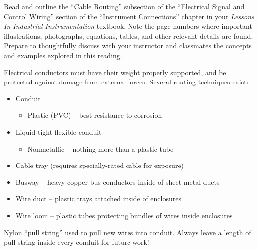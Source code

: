 

Read and outline the ``Cable Routing'' subsection of the ``Electrical Signal and Control Wiring'' section of the ``Instrument Connections'' chapter in your {\it Lessons In Industrial Instrumentation} textbook.  Note the page numbers where important illustrations, photographs, equations, tables, and other relevant details are found.  Prepare to thoughtfully discuss with your instructor and classmates the concepts and examples explored in this reading.














Electrical conductors must have their weight properly supported, and be protected against damage from external forces.  Several routing techniques exist:

\begin{itemize}
\item{} Conduit
\begin{itemize}

\item{} Plastic (PVC) -- best resistance to corrosion
\end{itemize}
\item{} Liquid-tight flexible conduit
\begin{itemize}

\item{} Nonmetallic -- nothing more than a plastic tube
\end{itemize}
\item{} Cable tray (requires specially-rated cable for exposure)
\item{} Busway -- heavy copper bus conductors inside of sheet metal ducts
\item{} Wire duct -- plastic trays attached inside of enclosures
\item{} Wire loom -- plastic tubes protecting bundles of wires inside enclosures
\end{itemize}

Nylon ``pull string'' used to pull new wires into conduit.  Always leave a length of pull string inside every conduit for future work!

